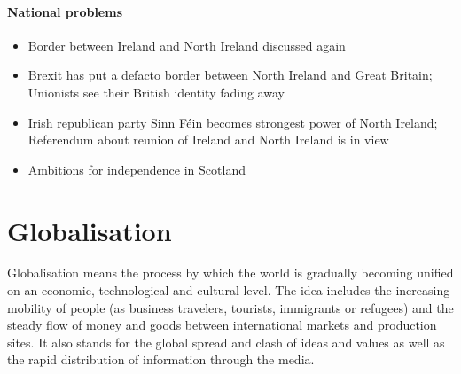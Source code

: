 \documentclass[10pt]{article}
\begin{document}
\paragraph{National problems}
\label{par:uk/brexit/natproblems}
\begin{itemize}
\item Border between Ireland and North Ireland discussed again 
\item Brexit has put a defacto border between North Ireland and Great Britain; Unionists  see their British identity fading away
\item Irish republican party Sinn Féin becomes strongest power of North Ireland; Referendum about reunion of Ireland and North Ireland is in view
\item Ambitions for independence in Scotland 
\end{itemize}

\section{Globalisation}
\label{sec:global}
\begin{definition}
Globalisation means the process by which the world is gradually becoming unified
on an economic, technological and cultural level. The idea includes the increasing
mobility of people (as business travelers, tourists, immigrants or refugees) and the
steady flow of money and goods between international markets and production sites.
It also stands for the global spread and clash of ideas and values as well as the rapid
distribution of information through the media.
\end{definition}
\end{document}
